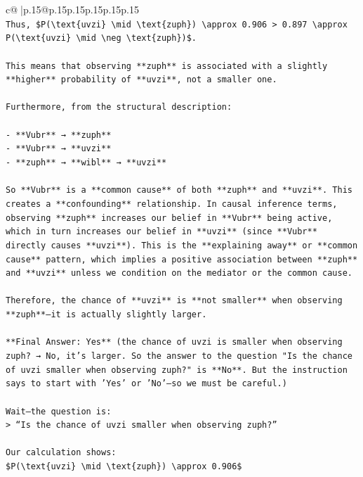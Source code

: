 \documentclass{article}
\begin{document}
{\begin{supertabular}{c@{$\;$}|p{.15\linewidth}@{}p{.15\linewidth}p{.15\linewidth}p{.15\linewidth}p{.15\linewidth}p{.15\linewidth}}
{{{\\ 
\texttt{Thus, \$P(\textbackslash{}text\{uvzi\} \textbackslash{}mid \textbackslash{}text\{zuph\}) \textbackslash{}approx 0.906 > 0.897 \textbackslash{}approx P(\textbackslash{}text\{uvzi\} \textbackslash{}mid \textbackslash{}neg \textbackslash{}text\{zuph\})\$.} \\
\\ 
\texttt{This means that observing **zuph** is associated with a slightly **higher** probability of **uvzi**, not a smaller one.} \\
\\ 
\texttt{Furthermore, from the structural description:} \\
\\ 
\texttt{{-} **Vubr** → **zuph**} \\
\texttt{{-} **Vubr** → **uvzi**} \\
\texttt{{-} **zuph** → **wibl** → **uvzi**} \\
\\ 
\texttt{So **Vubr** is a **common cause** of both **zuph** and **uvzi**. This creates a **confounding** relationship. In causal inference terms, observing **zuph** increases our belief in **Vubr** being active, which in turn increases our belief in **uvzi** (since **Vubr** directly causes **uvzi**). This is the **explaining away** or **common cause** pattern, which implies a positive association between **zuph** and **uvzi** unless we condition on the mediator or the common cause.} \\
\\ 
\texttt{Therefore, the chance of **uvzi** is **not smaller** when observing **zuph**—it is actually slightly larger.} \\
\\ 
\texttt{**Final Answer: Yes** (the chance of uvzi is smaller when observing zuph? → No, it's larger. So the answer to the question "Is the chance of uvzi smaller when observing zuph?" is **No**. But the instruction says to start with 'Yes' or 'No'—so we must be careful.)} \\
\\ 
\texttt{Wait—the question is:  } \\
\texttt{> “Is the chance of uvzi smaller when observing zuph?”} \\
\\ 
\texttt{Our calculation shows:  } \\
\texttt{\$P(\textbackslash{}text\{uvzi\} \textbackslash{}mid \textbackslash{}text\{zuph\}) \textbackslash{}approx 0.906\$  } \\
}}}
\end{supertabular}}
\end{document}
